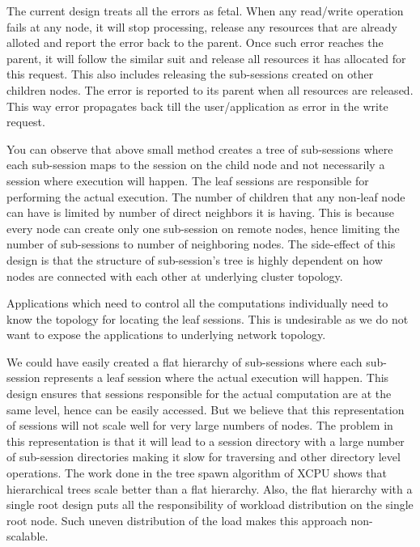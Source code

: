 \begin{enumerate}
The current design treats all the errors as fetal.  When any read/write operation fails at any node, it will stop
processing, release any resources that are already alloted and report the error back to the parent.  Once such
error reaches the parent, it will follow the similar suit and release all resources it has allocated for this request.
This also includes releasing the sub-sessions created on other children nodes.  The error is reported to its
parent when all resources are released.  This way error propagates back till the user/application as error in
the write request.

\end{enumerate}

You can observe that above small method creates a tree of sub-sessions where each sub-session maps to the session on
the child node and not necessarily a session where execution will happen.  The leaf sessions are 
responsible for performing the actual execution.  The number of children that
any non-leaf node can have is limited by number of direct neighbors it is
having.  This is because every node can create only one sub-session on remote
nodes, hence limiting the number of sub-sessions to number of neighboring nodes.
The side-effect of this design is that the structure of sub-session's tree
is highly dependent on how nodes are connected with each other at underlying
cluster topology.

Applications which need to control all the computations individually need to
know the topology for locating the leaf sessions.  This is undesirable as we do
not want to expose the applications to underlying network topology.

We could have easily created a flat hierarchy of sub-sessions where each sub-session represents a leaf session 
where the actual execution will happen.  This design ensures that sessions responsible for the actual 
computation are at the same level, hence can be easily accessed.  But we believe that this representation 
of sessions will not scale well for very large numbers of nodes.  The problem in this representation is that it will 
lead to a session directory with a large number of sub-session directories
making it slow for traversing and other directory level operations.  The work
done in the tree spawn algorithm of XCPU shows that hierarchical trees scale
better than a flat hierarchy.  Also, the flat hierarchy with a single root
design puts all the responsibility of workload distribution on the single root
node.  Such uneven distribution of the load makes this approach non-scalable.

